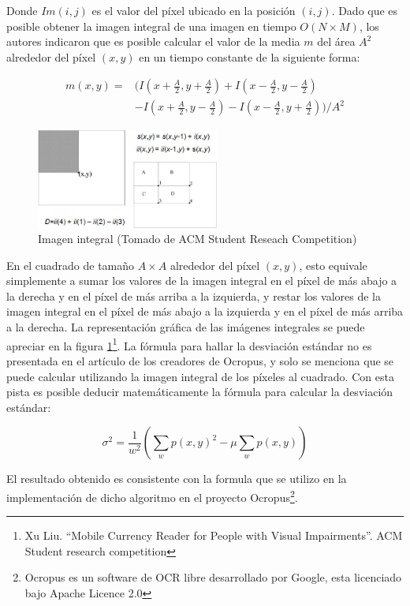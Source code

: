 \documentclass[a4paper, 11pt, oneside]{report}
\begin{document}
Donde $Im(i, j)$ es el valor del píxel ubicado en la posición $(i, j)$. Dado que es posible obtener la imagen integral de una imagen en tiempo $O(N \times M)$, los autores indicaron que es posible calcular el valor de la media $m$ del área $A^{2}$ alrededor del píxel $(x, y)$ en un tiempo constante de la siguiente forma:

\begin{align*}
  m(x, y) =& (I(x + \frac{A}{2}, y + \frac{A}{2}) + I(x - \frac{A}{2}, y - \frac{A}{2}) \\
	   &- I(x + \frac{A}{2}, y - \frac{A}{2}) - I(x - \frac{A}{2}, y + \frac{A}{2})) / A^{2}
\end{align*}

\begin{figure}[htb]
\begin{center}
\leavevmode
\includegraphics[width=6cm]{img/integral.png}
\end{center}
\caption{Imagen integral (Tomado de ACM Student Reseach Competition)}
\label{fig:integral}
\end{figure}

En el cuadrado de tamaño $A \times A$ alrededor del píxel $(x, y)$, esto equivale simplemente a sumar los valores de la imagen integral en el píxel de más abajo a la derecha y en el píxel de más arriba a la izquierda, y restar los valores de la imagen integral en el píxel de más abajo a la izquierda y en el píxel de más arriba a la derecha. La representación gráfica de las imágenes integrales se puede apreciar en la figura \ref{fig:integral}\footnote{Xu Liu. ``Mobile Currency Reader for People with Visual Impairments''. ACM Student research competition}. La fórmula para hallar la desviación estándar no es presentada en el artículo de los creadores de Ocropus, y solo se menciona que se puede calcular utilizando la imagen integral de los píxeles al cuadrado. Con esta pista es posible deducir matemáticamente la fórmula para calcular la desviación estándar:

\[ \sigma^2 = \frac{1}{w^2}\left(\sum_w{p(x,y)^2} - \mu \sum_w{p(x,y)}\right) \]

El resultado obtenido es consistente con la formula que se utilizo en la implementación de dicho algoritmo en el proyecto Ocropus\footnote{Ocropus es un software de OCR libre desarrollado por Google, esta licenciado bajo Apache Licence 2.0}.
\end{document}
